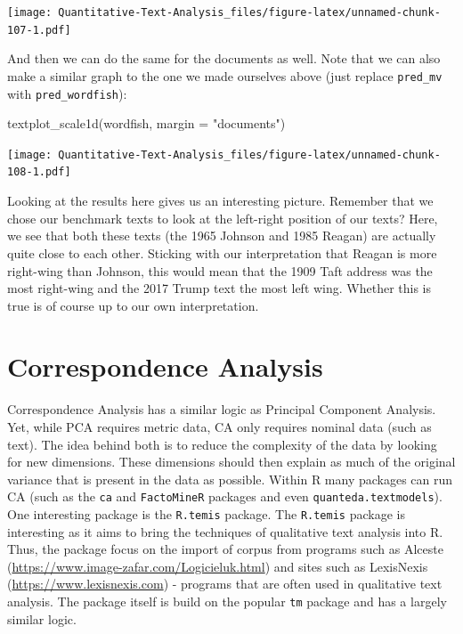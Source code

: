 \documentclass[
]{book}
\newenvironment{Shaded}{\begin{snugshade}}{\end{snugshade}}
\newcommand{\AttributeTok}[1]{\textcolor[rgb]{0.77,0.63,0.00}{#1}}
\newcommand{\FunctionTok}[1]{\textcolor[rgb]{0.00,0.00,0.00}{#1}}
\newcommand{\NormalTok}[1]{#1}
\newcommand{\StringTok}[1]{\textcolor[rgb]{0.31,0.60,0.02}{#1}}
\begin{document}
\texttt{[image: Quantitative-Text-Analysis\_files/figure-latex/unnamed-chunk-107-1.pdf]}

And then we can do the same for the documents as well. Note that we can also make a similar graph to the one we made ourselves above (just replace \texttt{pred\_mv} with \texttt{pred\_wordfish}):

\begin{Shaded}
\begin{Highlighting}[]
\FunctionTok{textplot\_scale1d}\NormalTok{(wordfish, }\AttributeTok{margin =} \StringTok{"documents"}\NormalTok{)}
\end{Highlighting}
\end{Shaded}

\texttt{[image: Quantitative-Text-Analysis\_files/figure-latex/unnamed-chunk-108-1.pdf]}

Looking at the results here gives us an interesting picture. Remember that we chose our benchmark texts to look at the left-right position of our texts? Here, we see that both these texts (the 1965 Johnson and 1985 Reagan) are actually quite close to each other. Sticking with our interpretation that Reagan is more right-wing than Johnson, this would mean that the 1909 Taft address was the most right-wing and the 2017 Trump text the most left wing. Whether this is true is of course up to our own interpretation.

\hypertarget{correspondence-analysis}{%
\section{Correspondence Analysis}\label{correspondence-analysis}}

Correspondence Analysis has a similar logic as Principal Component Analysis. Yet, while PCA requires metric data, CA only requires nominal data (such as text). The idea behind both is to reduce the complexity of the data by looking for new dimensions. These dimensions should then explain as much of the original variance that is present in the data as possible. Within R many packages can run CA (such as the \texttt{ca} and \texttt{FactoMineR} packages and even \texttt{quanteda.textmodels}). One interesting package is the \texttt{R.temis} package. The \texttt{R.temis} package is interesting as it aims to bring the techniques of qualitative text analysis into R. Thus, the package focus on the import of corpus from programs such as Alceste (\url{https://www.image-zafar.com/Logicieluk.html}) and sites such as LexisNexis (\url{https://www.lexisnexis.com}) - programs that are often used in qualitative text analysis. The package itself is build on the popular \texttt{tm} package and has a largely similar logic.
\end{document}
